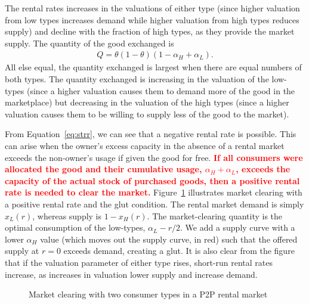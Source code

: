 \documentclass[11pt]{article}
\newcommand{\important}[1]{\textcolor{red}{\textbf{#1}}}
\newcommand{\important}[1]{#1}
\begin{document}
The rental rates increases in the valuations of either type (since higher valuation from low types increases demand while higher valuation from high types reduces supply) and decline with the fraction of high types, as they provide the market supply. 
The quantity of the good exchanged is 
\begin{align}
  Q = \theta (1-\theta) \left(1 - \alpha_H + \alpha_L\right).
\end{align} 
All else equal, the quantity exchanged is largest when there are equal numbers of both types.
The quantity exchanged is increasing in the valuation of the low-types (since a higher valuation causes them to demand more of the good in the marketplace) but decreasing in the valuation of the high types (since a higher valuation causes them to be willing to supply less of the good to the market). 

From Equation~\ref{eq:strr}, we can see that a negative rental rate is possible. 
This can arise when the owner's excess capacity in the absence of a rental market exceeds the non-owner's usage if given the good for free.
\important{If all consumers were allocated the good and their cumulative usage, $\alpha_H + \alpha_L$, exceeds the capacity of the actual stock of purchased goods, then a positive rental rate is needed to clear the market.}
Figure~\ref{fig:market_clearing} illustrates market clearing with a positive rental rate and the glut condition. 
The rental market demand is simply $x_L(r)$, whereas supply is $1-x_H(r)$. 
The market-clearing quantity is the optimal consumption of the low-types, $\alpha_L - r/2$. 
We add a supply curve with a lower $\alpha_H$ value (which moves out the supply curve, in red) such that the offered supply at $r = 0$ exceeds demand, creating a glut.  
It is also clear from the figure that if the valuation parameter of either type rises, short-run rental rates increase, as increases in valuation lower supply and increase demand. 
 
\newcommand*{\alphaH}{0.80}%
\newcommand*{\alphaL}{0.50}%
\newcommand*{\alphaHp}{0.40}
\pgfmathsetmacro{\r}{-1 + \alphaH + \alphaL}%
\pgfmathsetmacro{\Q}{\alphaL - \r/2}
\begin{figure} 
\caption{Market clearing with two consumer types in a P2P rental market} 
\label{fig:market_clearing} 
\begin{center}
\end{center}
\end{figure} 
\end{document}
